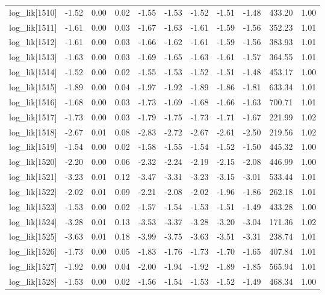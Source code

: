 \begin{table}[ht]
\begin{tabular}{rrrrrrrrrrr}
  log\_lik[1510] & -1.52 & 0.00 & 0.02 & -1.55 & -1.53 & -1.52 & -1.51 & -1.48 & 433.20 & 1.00 \\ 
  log\_lik[1511] & -1.61 & 0.00 & 0.03 & -1.67 & -1.63 & -1.61 & -1.59 & -1.56 & 352.23 & 1.01 \\ 
  log\_lik[1512] & -1.61 & 0.00 & 0.03 & -1.66 & -1.62 & -1.61 & -1.59 & -1.56 & 383.93 & 1.01 \\ 
  log\_lik[1513] & -1.63 & 0.00 & 0.03 & -1.69 & -1.65 & -1.63 & -1.61 & -1.57 & 364.55 & 1.01 \\ 
  log\_lik[1514] & -1.52 & 0.00 & 0.02 & -1.55 & -1.53 & -1.52 & -1.51 & -1.48 & 453.17 & 1.00 \\ 
  log\_lik[1515] & -1.89 & 0.00 & 0.04 & -1.97 & -1.92 & -1.89 & -1.86 & -1.81 & 633.34 & 1.01 \\ 
  log\_lik[1516] & -1.68 & 0.00 & 0.03 & -1.73 & -1.69 & -1.68 & -1.66 & -1.63 & 700.71 & 1.01 \\ 
  log\_lik[1517] & -1.73 & 0.00 & 0.03 & -1.79 & -1.75 & -1.73 & -1.71 & -1.67 & 221.99 & 1.02 \\ 
  log\_lik[1518] & -2.67 & 0.01 & 0.08 & -2.83 & -2.72 & -2.67 & -2.61 & -2.50 & 219.56 & 1.02 \\ 
  log\_lik[1519] & -1.54 & 0.00 & 0.02 & -1.58 & -1.55 & -1.54 & -1.52 & -1.50 & 445.32 & 1.00 \\ 
  log\_lik[1520] & -2.20 & 0.00 & 0.06 & -2.32 & -2.24 & -2.19 & -2.15 & -2.08 & 446.99 & 1.00 \\ 
  log\_lik[1521] & -3.23 & 0.01 & 0.12 & -3.47 & -3.31 & -3.23 & -3.15 & -3.01 & 533.44 & 1.01 \\ 
  log\_lik[1522] & -2.02 & 0.01 & 0.09 & -2.21 & -2.08 & -2.02 & -1.96 & -1.86 & 262.18 & 1.01 \\ 
  log\_lik[1523] & -1.53 & 0.00 & 0.02 & -1.57 & -1.54 & -1.53 & -1.51 & -1.49 & 433.28 & 1.00 \\ 
  log\_lik[1524] & -3.28 & 0.01 & 0.13 & -3.53 & -3.37 & -3.28 & -3.20 & -3.04 & 171.36 & 1.02 \\ 
  log\_lik[1525] & -3.63 & 0.01 & 0.18 & -3.99 & -3.75 & -3.63 & -3.51 & -3.31 & 238.74 & 1.01 \\ 
  log\_lik[1526] & -1.73 & 0.00 & 0.05 & -1.83 & -1.76 & -1.73 & -1.70 & -1.65 & 407.84 & 1.01 \\ 
  log\_lik[1527] & -1.92 & 0.00 & 0.04 & -2.00 & -1.94 & -1.92 & -1.89 & -1.85 & 565.94 & 1.01 \\ 
  log\_lik[1528] & -1.53 & 0.00 & 0.02 & -1.56 & -1.54 & -1.53 & -1.52 & -1.49 & 468.34 & 1.00 \\ 

\end{tabular}
\end{table}
